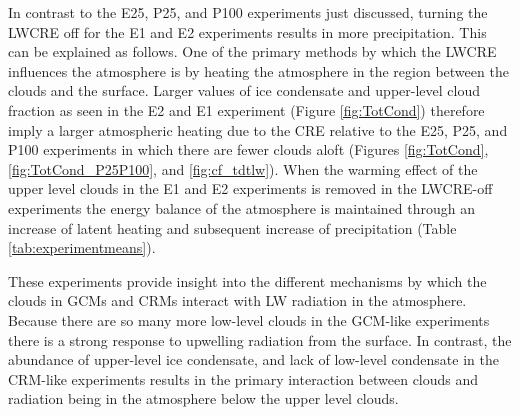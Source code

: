\documentclass[draft]{agujournal2019}
\begin{document}
{%

In contrast to the E25, P25, and P100 experiments just discussed, turning the LWCRE off for 
the E1 and E2 experiments results in more precipitation.  This can be explained as follows.  
One of the primary methods by which the LWCRE influences the atmosphere is by 
heating the atmosphere in the region between the clouds and the surface.  
Larger values of ice condensate and upper-level cloud fraction as seen in the E2 and E1 experiment 
(Figure \ref{fig:TotCond}) therefore imply a larger atmospheric heating due to the CRE relative to the 
E25, P25, and P100 experiments in which there are fewer clouds aloft (Figures \ref{fig:TotCond}, 
\ref{fig:TotCond_P25P100}, and \ref{fig:cf_tdtlw}).  When the warming effect of the upper level clouds 
in the E1 and E2 experiments is removed in the LWCRE-off experiments the energy balance of 
the atmosphere is maintained through an increase of latent heating and subsequent increase 
of precipitation (Table \ref{tab:experimentmeans}).  

These experiments provide insight into the different mechanisms by which the clouds in GCMs and CRMs
interact with LW radiation in the atmosphere.  Because there are so many more low-level clouds in 
the GCM-like experiments there is a strong response to upwelling radiation from the surface.  In contrast, 
the abundance of upper-level ice condensate, and lack of low-level condensate in the CRM-like experiments 
results in the primary interaction between clouds and radiation being in the atmosphere below the upper level clouds.       

%



}
\end{document}
